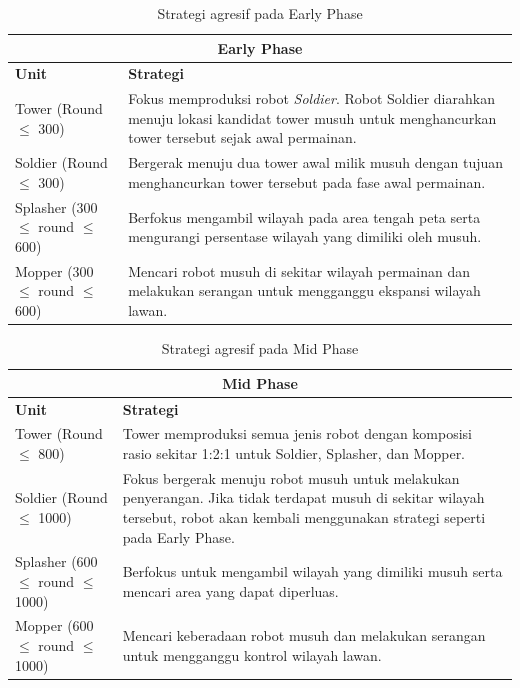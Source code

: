 \documentclass{article}
\renewcommand{\arraystretch}{1.3}
\begin{document}
\begin{table}[H]
\centering
\renewcommand{\arraystretch}{1.2}
\begin{tabular}{|p{3cm}|p{11cm}|}
\hline
\multicolumn{2}{|c|}{\textbf{Early Phase}} \\
\hline
\textbf{Unit} & \textbf{Strategi} \\
\hline

Tower (Round $\leq$ 300) &
Fokus memproduksi robot \textit{Soldier}. Robot Soldier diarahkan menuju lokasi kandidat tower musuh untuk menghancurkan tower tersebut sejak awal permainan. \\
\hline

Soldier (Round $\leq$ 300) &
Bergerak menuju dua tower awal milik musuh dengan tujuan menghancurkan tower tersebut pada fase awal permainan. \\
\hline

Splasher (300 $\leq$ round $\leq$ 600) &
Berfokus mengambil wilayah pada area tengah peta serta mengurangi persentase wilayah yang dimiliki oleh musuh. \\
\hline

Mopper (300 $\leq$ round $\leq$ 600) &
Mencari robot musuh di sekitar wilayah permainan dan melakukan serangan untuk mengganggu ekspansi wilayah lawan. \\
\hline

\end{tabular}
\caption{Strategi agresif pada Early Phase}
\end{table}

\begin{table}[H]
\centering
\renewcommand{\arraystretch}{1.2}
\begin{tabular}{|p{3cm}|p{11cm}|}
\hline
\multicolumn{2}{|c|}{\textbf{Mid Phase}} \\
\hline
\textbf{Unit} & \textbf{Strategi} \\
\hline

Tower (Round $\leq$ 800) &
Tower memproduksi semua jenis robot dengan komposisi rasio sekitar 1:2:1 untuk Soldier, Splasher, dan Mopper. \\
\hline

Soldier (Round $\leq$ 1000) &
Fokus bergerak menuju robot musuh untuk melakukan penyerangan. Jika tidak terdapat musuh di sekitar wilayah tersebut, robot akan kembali menggunakan strategi seperti pada Early Phase. \\
\hline

Splasher (600 $\leq$ round $\leq$ 1000) &
Berfokus untuk mengambil wilayah yang dimiliki musuh serta mencari area yang dapat diperluas. \\
\hline

Mopper (600 $\leq$ round $\leq$ 1000) &
Mencari keberadaan robot musuh dan melakukan serangan untuk mengganggu kontrol wilayah lawan. \\
\hline

\end{tabular}
\caption{Strategi agresif pada Mid Phase}
\end{table}
\end{document}
